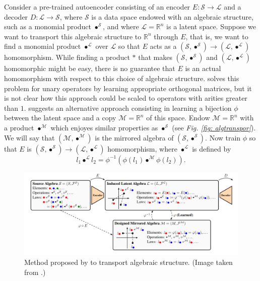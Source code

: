\documentclass[11pt,a4paper,openright,twoside]{report}
\theoremstyle{plain}
\theoremstyle{definition}
\begin{document}
Consider a pre-trained autoencoder consisting of an encoder $E: \mathcal{S} \to \mathcal{L}$ and a decoder $D: \mathcal{L} \to \mathcal{S}$, where $\mathcal{S}$ is a data space endowed with an algebraic structure, such as a monomial product $\bullet^{\mathcal{S}}$, and where $\mathcal{L}=\mathbb{R}^n$ is a latent space. Suppose we want to transport this algebraic structure to $\mathbb{R}^n$ through $E$, that is, we want to find a monomial product $\bullet^{\mathcal{L}}$ over $\mathcal{L}$ so that $E$ acts as a $(\mathcal{S},\bullet^{\mathcal{S}}) \to (\mathcal{L},\bullet^{\mathcal{L}})$ homomorphism. While finding a product $\ast$ that makes $(\mathcal{S},\bullet^{\mathcal{S}})$ and $(\mathcal{L},\bullet^{\mathcal{L}})$ homomorphic might be easy, there is no guarantee that $E$ is an actual homomorphism with respect to this choice of algebraic structure. \cite{chytas2024poolingimagedatasetsmultiple} solves this problem for unary operators by learning appropriate orthogonal matrices, but it is not clear how this approach could be scaled to operators with arities greater than $1$.  \cite{pfrommer2024transport} suggests an alternative approach consisting in learning a bijection $\phi$ between the latent space and a copy $\mathcal{M} = \mathbb{R}^n$ of this space. Endow $\mathcal{M} = \mathbb{R}^n$ with a product $\bullet^{\mathcal{M}}$ which enjoyes similar properties as $\bullet^{\mathcal{S}}$ (see \textit{Fig. \ref{fig: algtranspor}}). We will say that $(\mathcal{M},\bullet^{\mathcal{M}})$ is the mirrored algebra of $(\mathcal{S},\bullet^{\mathcal{S}})$. Now train $\phi$ so that $E$ is $(\mathcal{S},\bullet^{\mathcal{S}}) \to (\mathcal{L},\bullet^{\mathcal{L}})$ homomorphism, where $\bullet^{\mathcal{L}}$ is defined by
\[l_1 \bullet^{\mathcal{L}} l_2 = \phi^{-1}(\phi(l_1) \bullet^{\mathcal{M}} \phi(l_2)).\]

\begin{figure}[h]
  \begin{center}
    \includegraphics[width=1\textwidth]{figures/transport_of_algebraic_structure.png}     
    \caption[Transport of algebraic structure]{Method proposed by \cite{pfrommer2024transport} to transport algebraic structure. (Image taken from \cite{pfrommer2024transport}.)}
    \label{fig: algtransport}
  \end{center}
\end{figure}
\end{document}
